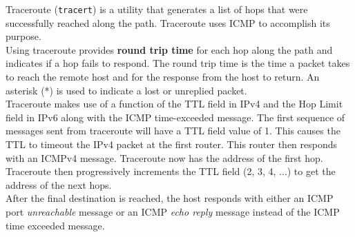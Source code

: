 
Traceroute (\verb|tracert|) is a utility that generates a list of hops that were successfully reached along the path. Traceroute uses ICMP to accomplish its purpose.\\

Using traceroute provides \textbf{round trip time} for each hop along the path and indicates if a hop fails to respond. The round trip time is the time a packet takes to reach the remote host and for the response from the host to return. An asterisk (*) is used to indicate a lost or unreplied packet.\\

Traceroute makes use of a function of the TTL field in IPv4 and the Hop Limit field in IPv6 along with the ICMP time-exceeded message. The first sequence of messages sent from traceroute will have a TTL field value of 1. This causes the TTL to timeout the IPv4 packet at the first router. This router then responds with an ICMPv4 message. Traceroute now has the address of the first hop. Traceroute then progressively increments the TTL field (2, 3, 4, ...) to get the address of the next hops.\\

After the final destination is reached, the host responds with either an ICMP port \emph{unreachable} message or an ICMP \emph{echo reply} message instead of the ICMP time exceeded message.